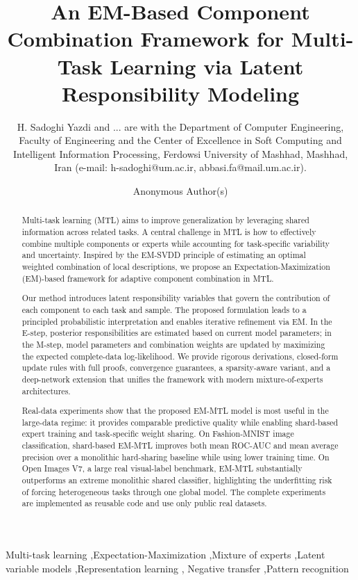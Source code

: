 \documentclass[preprint,12pt]{elsarticle}
\author{H. Sadoghi Yazdi and ... are with the Department of Computer Engineering, Faculty of Engineering and the
	Center of Excellence in Soft Computing and Intelligent Information Processing, Ferdowsi University of Mashhad, Mashhad, Iran (e-mail: h-sadoghi@um.ac.ir, abbasi.fa@mail.um.ac.ir). }
\begin{document}
	
	\begin{frontmatter}
		
		\title{An EM-Based Component Combination Framework for Multi-Task Learning
			via Latent Responsibility Modeling}
		
		\author{Anonymous Author(s)}
		
		\begin{abstract}
			Multi-task learning (MTL) aims to improve generalization by leveraging
			shared information across related tasks. A central challenge in MTL is how
			to effectively combine multiple components or experts while accounting for
			task-specific variability and uncertainty. Inspired by the EM-SVDD
			principle of estimating an optimal weighted combination of local
			descriptions, we propose an Expectation-Maximization (EM)-based framework
			for adaptive component combination in MTL.
			
			Our method introduces latent responsibility variables that govern the
			contribution of each component to each task and sample. The proposed
			formulation leads to a principled probabilistic interpretation and enables
			iterative refinement via EM. In the E-step, posterior responsibilities are
			estimated based on current model parameters; in the M-step, model
			parameters and combination weights are updated by maximizing the expected
			complete-data log-likelihood. We provide rigorous derivations, closed-form
			update rules with full proofs, convergence guarantees, a sparsity-aware
			variant, and a deep-network extension that unifies the framework with
			modern mixture-of-experts architectures.
			
			Real-data experiments show that the proposed EM-MTL model is most
			useful in the large-data regime: it provides comparable predictive
			quality while enabling shard-based expert training and task-specific
			weight sharing. On Fashion-MNIST image classification, shard-based
			EM-MTL improves both mean ROC-AUC and mean average precision over a
			monolithic hard-sharing baseline while using lower training time.
			On Open Images V7, a large real visual-label benchmark, EM-MTL
			substantially outperforms an extreme monolithic shared classifier,
			highlighting the underfitting risk of forcing heterogeneous tasks
			through one global model. The complete experiments are implemented
			as reusable code and use only public real datasets.
		\end{abstract}
		
		\begin{keyword}
			Multi-task learning \sep Expectation-Maximization \sep Mixture of experts
			\sep Latent variable models \sep Representation learning \sep
			Negative transfer \sep Pattern recognition
		\end{keyword}
		
	\end{frontmatter}
	
\end{document}
